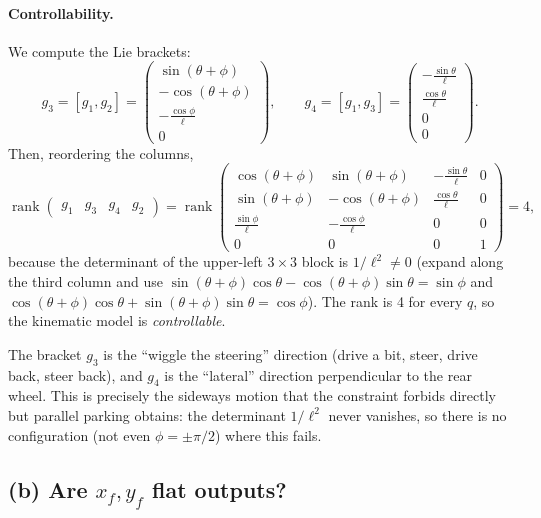 \documentclass[11pt,a4paper]{article}
\def\boldsymbol#1{#1}%
\DeclareMathOperator{\rank}{rank}
\newcommand{\q}{\boldsymbol{q}}
\newcommand{\g}{\boldsymbol{g}}
\theoremstyle{definition}
\theoremstyle{plain}
\theoremstyle{remark}
\begin{document}
\paragraph{Controllability.} We compute the Lie brackets:
\[
  \g_3=[\g_1,\g_2]=\begin{pmatrix}\sin(\theta+\phi)\\-\cos(\theta+\phi)\\-\frac{\cos\phi}{\ell}\\0\end{pmatrix},\qquad
  \g_4=[\g_1,\g_3]=\begin{pmatrix}-\frac{\sin\theta}{\ell}\\ \frac{\cos\theta}{\ell}\\0\\0\end{pmatrix}.
\]
Then, reordering the columns,
\[
  \rank\begin{pmatrix}\g_1&\g_3&\g_4&\g_2\end{pmatrix}=
  \rank\begin{pmatrix}
    \cos(\theta+\phi)&\sin(\theta+\phi)&-\frac{\sin\theta}{\ell}&0\\
    \sin(\theta+\phi)&-\cos(\theta+\phi)&\frac{\cos\theta}{\ell}&0\\
    \frac{\sin\phi}{\ell}&-\frac{\cos\phi}{\ell}&0&0\\
    0&0&0&1
  \end{pmatrix}=4,
\]
because the determinant of the upper-left $3\times3$ block is $1/\ell^2\neq0$ (expand along the third column and use $\sin(\theta+\phi)\cos\theta-\cos(\theta+\phi)\sin\theta=\sin\phi$ and $\cos(\theta+\phi)\cos\theta+\sin(\theta+\phi)\sin\theta=\cos\phi$). The rank is 4 for every $\q$, so the kinematic model is \emph{controllable}.

\begin{intuition}
The bracket $\g_3$ is the ``wiggle the steering'' direction (drive a bit, steer, drive back, steer back), and $\g_4$ is the ``lateral'' direction perpendicular to the rear wheel. This is precisely the sideways motion that the constraint forbids directly but parallel parking obtains: the determinant $1/\ell^2$ never vanishes, so there is no configuration (not even $\phi=\pm\pi/2$) where this fails.
\end{intuition}

\subsection{(b) Are $x_f,y_f$ flat outputs?}
\end{document}
